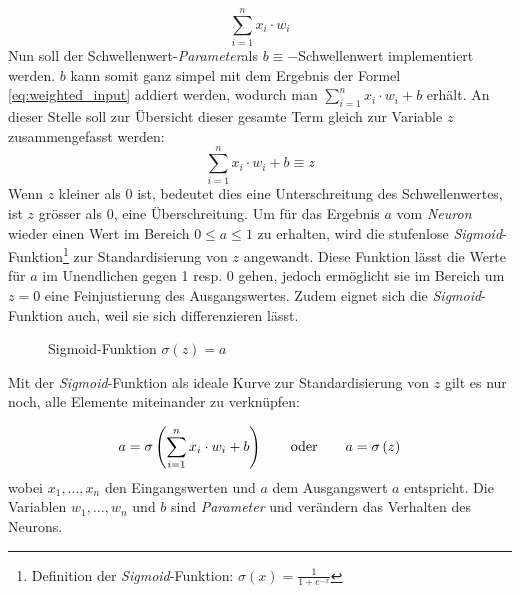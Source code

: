 \begin{equation}\label{eq:weighted_input}
	\sum_{i=1}^{n} x_i\cdot w_i
\end{equation}
Nun soll der Schwellenwert-\textit{Parameter}\footnotemark[\value{footnote}] als $b \equiv -$Schwellenwert implementiert werden. $b$ kann somit ganz simpel mit dem Ergebnis der Formel \ref{eq:weighted_input} addiert werden, wodurch man $\sum_{i=1}^{n} x_i\cdot w_i+b$ erhält. An dieser Stelle soll zur Übersicht dieser gesamte Term gleich zur Variable $z$ zusammengefasst werden:
\begin{equation}\label{eq:def_z}
\sum_{i=1}^{n} x_i\cdot w_i+b\equiv z
\end{equation}
Wenn $z$ kleiner als 0 ist, bedeutet dies eine Unterschreitung des Schwellenwertes, ist $z$ grösser als 0, eine Überschreitung. Um für das Ergebnis $a$ vom \textit{Neuron} wieder einen Wert im Bereich $0 \leq a \leq 1$ zu erhalten, wird die stufenlose \textit{Sigmoid}-Funktion\footnote{Definition der \textit{Sigmoid}-Funktion: $\sigma(x) = \frac{1}{1+e^{-x}}$} zur Standardisierung von $z$ angewandt. Diese Funktion lässt die Werte für $a$ im Unendlichen gegen 1 resp. 0 gehen, jedoch ermöglicht sie im Bereich um $z=0$ eine Feinjustierung des Ausgangswertes. Zudem eignet sich die \textit{Sigmoid}-Funktion auch, weil sie sich differenzieren lässt.

\begin{figure}[h]
	\centering
	\caption[Sigmoid-Funktion]{Sigmoid-Funktion $\sigma(z) = a$}
	\label{plt:sigmoid}
\end{figure}
Mit der \textit{Sigmoid}-Funktion als ideale Kurve zur Standardisierung von $z$ gilt es nur noch, alle Elemente miteinander zu verknüpfen:


\begin{equation}\label{eq:neuron_eq}
a = \sigma \left( \sum_{i=1}^{n} x_i\cdot w_i+b\right)  \qquad \text{oder} \qquad a = \sigma \left( z \right)
\vspace*{2mm}
\end{equation}
wobei $x_1,...,x_n$ den Eingangswerten und $a$ dem Ausgangswert $a$ entspricht. Die Variablen $w_1,...,w_n$ und $b$ sind \textit{Parameter} und verändern das Verhalten des Neurons.

